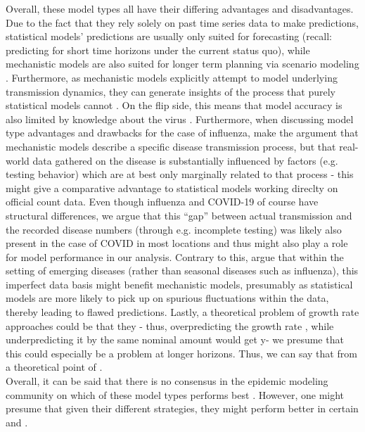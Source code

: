 Overall, these model types all have their differing advantages and disadvantages. Due to the fact that they rely solely on past time series data to make predictions, statistical models' predictions are usually only suited for forecasting (recall: predicting for short time horizons under the current status quo), while mechanistic models are also suited for longer term planning via scenario modeling \cite{reich_collaborative_2022}. Furthermore, as mechanistic models explicitly attempt to model underlying transmission dynamics, they can generate insights of the process that purely statistical models cannot \cite{james_use_2021} . On the flip side, this means that model accuracy is also limited by knowledge about the virus \cite{holmdahl_wrong_2020}. Furthermore, when discussing model type advantages and drawbacks for the case of influenza, \cite{reich_collaborative_2019} make the argument that mechanistic models describe a specific disease transmission process, but that real-world data gathered on the disease is substantially influenced by factors (e.g. testing behavior) which are at best only marginally related to that process - this might give a comparative advantage to statistical models working direclty on official count data. Even though influenza and COVID-19 of course have structural differences, we argue that this ``gap'' between actual transmission and the recorded disease numbers (through e.g. incomplete testing) was likely also present in the case of COVID in most locations and thus might also play a role for model performance in our analysis. Contrary to this, \cite{bracher_evaluating_2021} argue that within the setting of emerging diseases (rather than seasonal diseases such as influenza), this imperfect data basis might benefit mechanistic models, presumably as statistical models are more likely to pick up on spurious fluctuations within the data, thereby leading to flawed predictions. Lastly, a theoretical problem of growth rate approaches could be that they - thus, overpredicting the growth rate , while underpredicting it by the same nominal  amount would get y- we presume that this could especially be a problem at longer horizons. Thus, we can say that from a theoretical point of .\\
Overall, it can be said that there is no consensus in the epidemic modeling community on which of these model types performs best \cite{moran_epidemic_2016}. However, one might presume that given their different strategies, they might perform better in certain and .  \\
